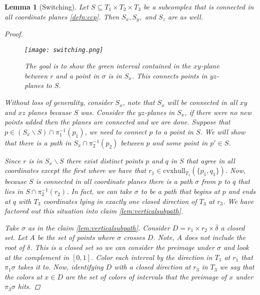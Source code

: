 \documentclass{article}
\theoremstyle{mystyle}
\newtheorem{lem}[thm]{Lemma}
\theoremstyle{remark}
\begin{document}
\begin{lem}
    [Switching]
    \label{lem:switching} 
    Let \(S \subseteq T_1\times T_2\times T_3\) be a subcomplex that is connected in all coordinate planes \ref{defn:ccp}. Then \(S_{x}, S_{y},\) and \(S_{z}\) are as well. 
    \begin{proof}
    
    
    \begin{figure}[!h]
    \centering
    \texttt{[image: switching.png]}
    \caption{The goal is to show the green interval contained in the $xy$-plane between $r$ and a point in $\sigma$ is in $S_x$. This connects points in $yz$-planes to $S$.}
    \label{fig:square}
\end{figure}
    
        Without loss of generality, consider \(S_{ x}\), note that \(S_{x}\) will be connected in all \(xy\) and \(xz\) planes because \(S\) was. Consider the \(yz\)-planes in \(S_{x}\), if there were no new points added then the planes are connected and we are done. Suppose that \( p \in (S_{x} \smallsetminus S ) \cap \pi^{-1} _{1} (p_{1} )\), we need to connect \(p\) to a point in \(S\). We will show that there is a path in \(S_{x} \cap \pi_{2}^{-1} (p_{2} )\) between \(p\) and some point in \(p' \in S\).
       
        Since \(r\) is in \(S_x \smallsetminus S\) there exist distinct points \(p\) and \(q\) in \(S\) that agree in all coordinates except the first where we have that \(r_{1} \in \text{cvxhull}_{T_{1}}  (\{p_{1} , q_{1}\})\). Now, because \(S\) is connected in all coordinate planes there is a path \(\sigma\) from \(p\) to \(q\) that lies in \(S \cap \pi_{2}^{-1} (r_{2})\). In fact, we can take \(\sigma\) to be a path that begins at \(p\) and ends at \(q\) with \(T_{3}\) coordinates lying in exactly one closed direction of \(T_{3}\) at \(r_{3}\). We have factored out this situation into claim \ref{lem:verticalsubpath}.  

        Take \(\sigma\) as in the claim \ref{lem:verticalsubpath}. Consider \(D = r_1 \times r_{2} \times \overline \delta\) a closed set. Let \(A\) be the set of points where \(\sigma\) crosses \(D\). Note, $A$ does not include the root of $\delta$. This is a closed set so we can consider the preimage under \(\sigma\) and look at the complement in \([0,1]\). Color each interval by the direction in \(T_{1}\) at \(r_{1}\) that \(\pi_{1} \sigma\) takes it to. Now, identifying \(D\) with a closed direction at \(r_3\) in \(T_3\) we say that the colors at \(x \in D\) are the set of colors of intervals that the preimage of \(x\) under \(\pi_{3} \sigma\) hits.


\end{proof}
\end{lem}
\end{document}
